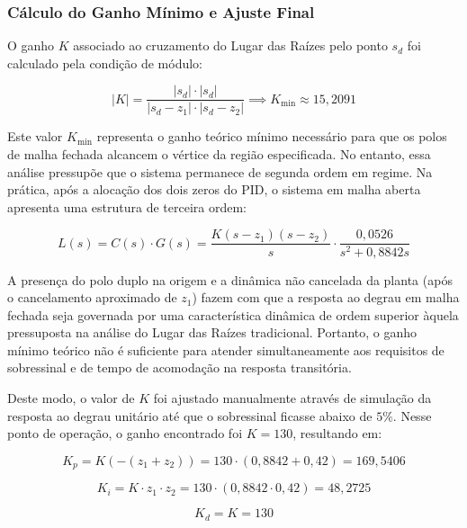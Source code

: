 \documentclass[12pt, a4paper]{article}
\begin{document}
			\subsubsection{Cálculo do Ganho Mínimo e Ajuste Final}

				O ganho $K$ associado ao cruzamento do Lugar das Raízes pelo ponto $s_d$ foi calculado pela condição de módulo:

				\begin{equation}
					|K| = \frac{|s_d| \cdot |s_d|}{|s_d - z_1| \cdot |s_d - z_2|} \implies K_{\min} \approx 15{,}2091
				\end{equation}

				Este valor $K_{\min}$ representa o ganho teórico mínimo necessário para que os polos de malha fechada alcancem o vértice da região especificada. No entanto, essa análise pressupõe que o sistema permanece de segunda ordem em regime. Na prática, após a alocação dos dois zeros do PID, o sistema em malha aberta apresenta uma estrutura de terceira ordem:

				\begin{equation}
					L(s) = C(s) \cdot G(s) = \frac{K(s-z_1)(s-z_2)}{s} \cdot \frac{0{,}0526}{s^2 + 0{,}8842s}
				\end{equation}

				A presença do polo duplo na origem e a dinâmica não cancelada da planta (após o cancelamento aproximado de $z_1$) fazem com que a resposta ao degrau em malha fechada seja governada por uma característica dinâmica de ordem superior àquela pressuposta na análise do Lugar das Raízes tradicional. Portanto, o ganho mínimo teórico não é suficiente para atender simultaneamente aos requisitos de sobressinal e de tempo de acomodação na resposta transitória.

				Deste modo, o valor de $K$ foi ajustado manualmente através de simulação da resposta ao degrau unitário até que o sobressinal ficasse abaixo de $5\%$. Nesse ponto de operação, o ganho encontrado foi $K = 130$, resultando em:

				\begin{equation}
					K_p = K(-(z_1 + z_2)) = 130 \cdot (0{,}8842 + 0{,}42) = 169{,}5406
				\end{equation}

				\begin{equation}
					K_i = K \cdot z_1 \cdot z_2 = 130 \cdot (0{,}8842 \cdot 0{,}42) = 48{,}2725
				\end{equation}

				\begin{equation}
					K_d = K = 130
				\end{equation}
\end{document}
